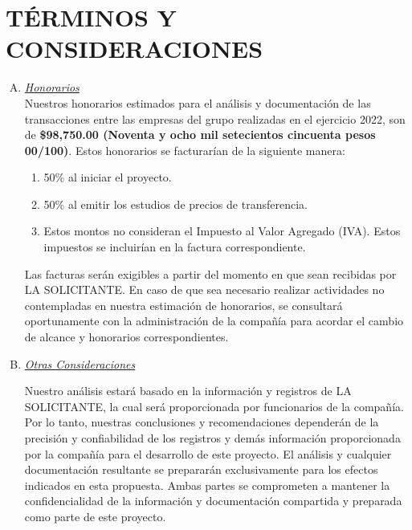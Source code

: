 \documentclass[5pt,letter]{report}
\begin{document}
\section{TÉRMINOS Y CONSIDERACIONES}

\begin{enumerate}[A)]
\item \textit{\underline{Honorarios}}\\[5pt]

Nuestros honorarios estimados para el análisis y documentación de las transacciones entre las empresas del grupo realizadas en el ejercicio 2022, son de  \textcolor{principal}{\textbf{\$98,750.00 (Noventa y ocho mil setecientos cincuenta pesos 00/100)}}. Estos honorarios se facturarían de la siguiente manera: 

\begin{enumerate}[1.]
\item 50\% al iniciar el proyecto. 

\item 50\% al emitir los estudios de precios de transferencia. 

\item Estos montos no consideran el Impuesto al Valor Agregado (IVA). Estos impuestos se incluirían en la factura correspondiente. 

\end{enumerate}

Las facturas serán exigibles a partir del momento en que sean recibidas por LA SOLICITANTE. En caso de que sea necesario realizar actividades no contempladas en nuestra estimación de honorarios, se consultará oportunamente con la administración de la compañía para acordar el cambio de alcance y honorarios correspondientes. 

\item \textit{\underline{Otras Consideraciones }}

Nuestro análisis estará basado en la información y registros de LA SOLICITANTE, la cual será proporcionada por funcionarios de la compañía. Por lo tanto, nuestras conclusiones y recomendaciones dependerán de la precisión y confiabilidad de los registros y demás información proporcionada por la compañía para el desarrollo de este proyecto. El análisis y cualquier documentación resultante se prepararán exclusivamente para los efectos indicados en esta propuesta. Ambas partes se comprometen a mantener la confidencialidad de la información y documentación compartida y preparada como parte de este proyecto. \\[5pt]


\end{enumerate}
\end{document}
